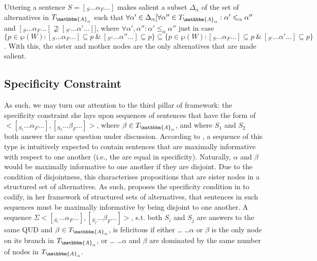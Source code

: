 Uttering a sentence $S=[_S\ldots\alpha_F\ldots]$ makes salient a subset $\Delta_\alpha$ of the set of alternatives in $T_{\mathbbm{A}_\alpha}$ such that $\forall\alpha'\in\Delta_\alpha[\forall\alpha''\in T_{\mathbbm{A}_\alpha}: \alpha'\leqslant_\alpha \alpha''$ and $[_{S}\ldots\alpha_F\ldots]\not\supseteq[_{S'}\ldots\alpha'\ldots]]$, where $\forall\alpha',\alpha'':\alpha'\leqslant_\alpha \alpha''$ just in case $\{p\in\wp(W):[_S\ldots\alpha_F\ldots]\subseteq p~\&~[_{S''}\ldots\alpha''\ldots]\subseteq p\}\subseteq\{p\in\wp(W):[_S\ldots\alpha_F\ldots]\subseteq p~\&~[_{S'}\ldots\alpha'\ldots]\subseteq p\}$.
\xe
With this, the sister and mother nodes are the only alternatives that are made salient. 


\subsection{Specificity Constraint}
As such, we may turn our attention to the third pillar of  framework: the specificity constraint she lays upon sequences of sentences that have the form of $<[_{S_1}\ldots\alpha_F\ldots],[_{S_2}\ldots\beta_F\ldots]>$, where $\beta\in T_{\mathbbm{A}_\alpha}$, and where $S_1$ and $S_2$ both answer the same question under discussion. According to \textcite{Ippolito2020}, a sequence of this type is intuitively expected to contain sentences that are maximally informative with respect to one another (i.e., the are equal in specificity). Naturally, $\alpha$ and $\beta$ would be maximally informative to one another if they are disjoint. Due to the condition of disjointness, this characterises propositions that are sister nodes in a structured set of alternatives. As such, \textcite{Ippolito2020} proposes the specificity condition in  to codify, in her framework of structured sets of alternatives, that sentences in such sequences must be maximally informative by being disjoint to one another.
\pex
{}
A sequence $\Sigma<[_{S_i}\ldots\alpha_F\ldots],[_{S_j}\ldots\beta_F\ldots]>$, s.t. both
$S_i$ and $S_j$ are answers to the same QUD and $\beta\in T_{\mathbbm{A}_\alpha}$, is felicitous if either \dots
\a \dots $\alpha$ or $\beta$ is the only node on its branch in $T_{\mathbbm{A}_\alpha}$, or \dots {}
\a \dots $\alpha$ and $\beta$ are dominated by the same number of nodes in $T_{\mathbbm{A}_\alpha}$.\\\emptyfill\parencite[p.~643]{Ippolito2020}
